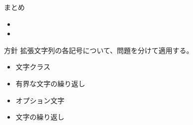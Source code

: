 \documentclass[dvipdfmx,12pt,beamer]{standalone}
\begin{document}
\begin{frame}{まとめ}
	\begin{itemize}
		\item \ShiftAnd
		\item \BNDM
	\end{itemize}

	\begin{block}{方針}
		拡張文字列の各記号について、問題を分けて適用する。
		\begin{itemize}
			\item 文字クラス
			\item 有界な文字の繰り返し
			\item オプション文字
			\item 文字の繰り返し
		\end{itemize}
	\end{block}

\end{frame}
\end{document}
